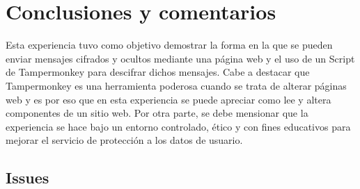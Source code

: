 \documentclass[letter,12pt]{article}
\begin{document}
\section*{Conclusiones y comentarios}

Esta experiencia tuvo como objetivo demostrar la forma en la que se pueden enviar mensajes cifrados y ocultos mediante una página web y el uso de un Script de Tampermonkey para descifrar dichos mensajes. Cabe a destacar que Tampermonkey es una herramienta poderosa cuando se trata de alterar páginas web y es por eso que en esta experiencia se puede apreciar como lee y altera componentes de un sitio web. Por otra parte, se debe mensionar que la experiencia se hace bajo un entorno controlado, ético y con fines educativos para mejorar el servicio de protección a los datos de usuario.

\clearpage

\subsection*{Issues}
\end{document}
